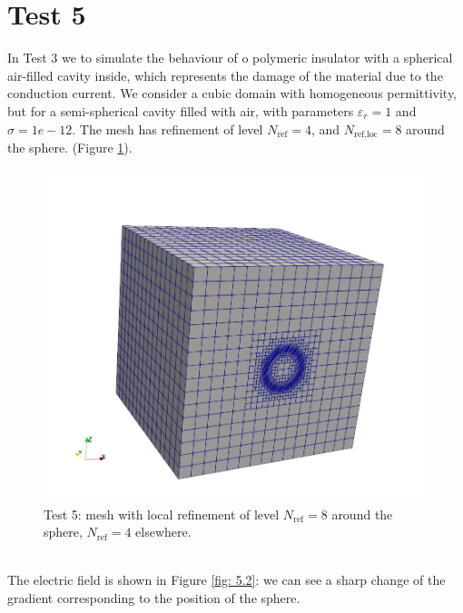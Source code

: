 \documentclass{Configuration_Files/PoliMi3i_thesis}
\let\epsilon\varepsilon
\begin{document}
\section{Test 5}
In Test 3 we to simulate the behaviour of o polymeric insulator with a spherical air-filled cavity inside, which represents the damage of the material due to the conduction current. We consider a cubic domain with homogeneous permittivity, but for a semi-spherical cavity filled with air, with parameters $\epsilon_r=1$ and $\sigma=1e-12$.
The mesh has refinement of level $N_\text{ref}=4$, and $N_\text{ref,loc}=8$ around the sphere. (Figure \ref{fig: 5.1}).
\begin{figure}[h!]
    \centering
   \includegraphics[scale=0.25]{Images/5.grid.jpeg}
    \caption {Test 5: mesh with local refinement of level $N_\text{ref}=8$ around the sphere, $N_\text{ref}=4$ elsewhere.}
    \label{fig: 5.1}
\end{figure}
\\The electric field is shown in Figure \ref{fig: 5.2}: we can see a sharp change of the gradient corresponding to the position of the sphere. 
\end{document}
